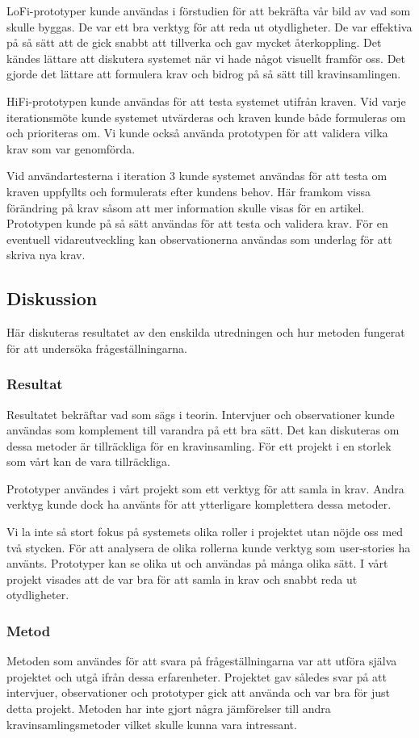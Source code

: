 LoFi-prototyper kunde användas i förstudien för att bekräfta vår bild av vad som skulle byggas. De var ett bra verktyg för att reda ut otydligheter. De var effektiva på så sätt att de gick snabbt att tillverka och gav mycket återkoppling. Det kändes lättare att diskutera systemet när vi hade något visuellt framför oss. Det gjorde det lättare att formulera krav och bidrog på så sätt till kravinsamlingen.

HiFi-prototypen kunde användas för att testa systemet utifrån kraven. Vid varje iterationsmöte kunde systemet utvärderas och kraven kunde både formuleras om och prioriteras om. Vi kunde också använda prototypen för att validera vilka krav som var genomförda. 
 
Vid användartesterna i iteration 3 kunde systemet användas för att testa om kraven uppfyllts och formulerats efter kundens behov. Här framkom vissa förändring på krav såsom att mer information skulle visas för en artikel. Prototypen kunde på så sätt användas för att testa och validera krav. För en eventuell vidareutveckling kan observationerna användas som underlag för att skriva nya krav.

\subsection{Diskussion}
Här diskuteras resultatet av den enskilda utredningen och hur metoden fungerat för att undersöka frågeställningarna.
\subsubsection{Resultat}
Resultatet bekräftar vad som sägs i teorin. Intervjuer och observationer kunde användas som komplement till varandra på ett bra sätt. Det kan diskuteras om dessa metoder är tillräckliga för en kravinsamling. För ett projekt i en storlek som vårt kan de vara tillräckliga. 

Prototyper användes i vårt projekt som ett verktyg för att samla in krav. Andra verktyg kunde dock ha använts för att ytterligare komplettera dessa metoder. 

Vi la inte så stort fokus på systemets olika roller i projektet utan nöjde oss med två stycken. För att analysera de olika rollerna kunde verktyg som user-stories ha använts.
Prototyper kan se olika ut och användas på många olika sätt. I vårt projekt visades att de var bra för att samla in krav och snabbt reda ut otydligheter. 
\subsubsection{Metod}
Metoden som användes för att svara på frågeställningarna var att utföra själva projektet och utgå ifrån dessa erfarenheter. Projektet gav således svar på att intervjuer, observationer och prototyper gick att använda och var bra för just detta projekt. Metoden har inte gjort några jämförelser till andra kravinsamlingsmetoder vilket skulle kunna vara intressant. 

